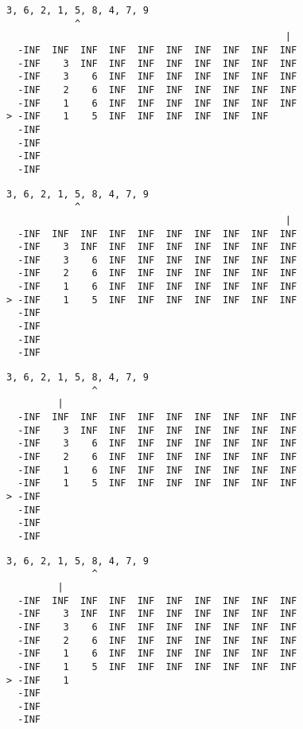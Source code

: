{ \begin{verbatim}
3, 6, 2, 1, 5, 8, 4, 7, 9
            ^
                                                 |
  -INF  INF  INF  INF  INF  INF  INF  INF  INF  INF
  -INF    3  INF  INF  INF  INF  INF  INF  INF  INF
  -INF    3    6  INF  INF  INF  INF  INF  INF  INF
  -INF    2    6  INF  INF  INF  INF  INF  INF  INF
  -INF    1    6  INF  INF  INF  INF  INF  INF  INF
> -INF    1    5  INF  INF  INF  INF  INF  INF     
  -INF                                             
  -INF                                             
  -INF                                             
  -INF                                             
\end{verbatim} }

{ \begin{verbatim}
3, 6, 2, 1, 5, 8, 4, 7, 9
            ^
                                                 |
  -INF  INF  INF  INF  INF  INF  INF  INF  INF  INF
  -INF    3  INF  INF  INF  INF  INF  INF  INF  INF
  -INF    3    6  INF  INF  INF  INF  INF  INF  INF
  -INF    2    6  INF  INF  INF  INF  INF  INF  INF
  -INF    1    6  INF  INF  INF  INF  INF  INF  INF
> -INF    1    5  INF  INF  INF  INF  INF  INF  INF
  -INF                                             
  -INF                                             
  -INF                                             
  -INF                                             
\end{verbatim} }

{ \begin{verbatim}
3, 6, 2, 1, 5, 8, 4, 7, 9
               ^
         |
  -INF  INF  INF  INF  INF  INF  INF  INF  INF  INF
  -INF    3  INF  INF  INF  INF  INF  INF  INF  INF
  -INF    3    6  INF  INF  INF  INF  INF  INF  INF
  -INF    2    6  INF  INF  INF  INF  INF  INF  INF
  -INF    1    6  INF  INF  INF  INF  INF  INF  INF
  -INF    1    5  INF  INF  INF  INF  INF  INF  INF
> -INF                                             
  -INF                                             
  -INF                                             
  -INF                                             
\end{verbatim} }

{ \begin{verbatim}
3, 6, 2, 1, 5, 8, 4, 7, 9
               ^
         |
  -INF  INF  INF  INF  INF  INF  INF  INF  INF  INF
  -INF    3  INF  INF  INF  INF  INF  INF  INF  INF
  -INF    3    6  INF  INF  INF  INF  INF  INF  INF
  -INF    2    6  INF  INF  INF  INF  INF  INF  INF
  -INF    1    6  INF  INF  INF  INF  INF  INF  INF
  -INF    1    5  INF  INF  INF  INF  INF  INF  INF
> -INF    1                                        
  -INF                                             
  -INF                                             
  -INF                                             
\end{verbatim} }

